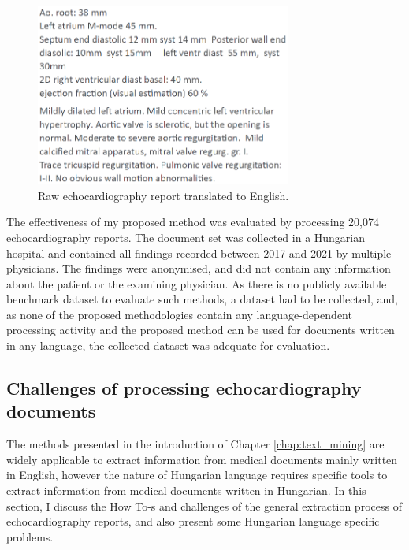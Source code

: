 \begin{figure}[h]
	\centering
        \captionsetup{justification=centering}
	\includegraphics[width=0.75\textwidth]{assets/figures/text_mining/corpus/raw_echo_example.eps}
	\caption{Raw echocardiography report translated to English.}
	\label{fig:raw_echo_example}
\end{figure}

The effectiveness of my proposed method was evaluated by processing 20,074 echocardiography reports. The document set was collected in a Hungarian hospital and contained all findings recorded between 2017 and 2021 by multiple physicians. The findings were anonymised, and did not contain any information about the patient or the examining physician. As there is no publicly available benchmark dataset to evaluate such methods, a dataset had to be collected, and, as none of the proposed methodologies contain any language-dependent processing activity and the proposed method can be used for documents written in any language, the collected dataset was adequate for evaluation.

\subsection{Challenges of processing echocardiography documents}
\label{sec:challenges}

The methods presented in the introduction of Chapter \ref{chap:text_mining} are widely applicable to extract information from medical documents mainly written in English, however the nature of Hungarian language requires specific tools to extract information from medical documents written in Hungarian. In this section, I discuss the How To-s and challenges of the general extraction process of echocardiography reports, and also present some Hungarian language specific problems.

